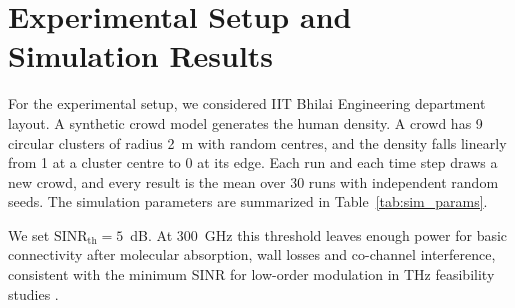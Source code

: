 \documentclass[conference]{IEEEtran}
\begin{document}
	\section{Experimental Setup and Simulation Results}

	For the experimental setup, we considered IIT Bhilai Engineering department layout. A synthetic crowd model generates the human density. A crowd has 9 circular clusters of radius 2~m with random centres, and the density falls linearly from 1 at a cluster centre to 0 at its edge. Each run and each time step draws a new crowd, and every result is the mean over 30 runs with independent random seeds. The simulation parameters are summarized in Table~\ref{tab:sim_params}.

	We set $\text{SINR}_{\text{th}} = 5$~dB. At 300~GHz this threshold leaves enough power for basic connectivity after molecular absorption, wall losses and co-channel interference, consistent with the minimum SINR for low-order modulation in THz feasibility studies \cite{b5}.
\end{document}
